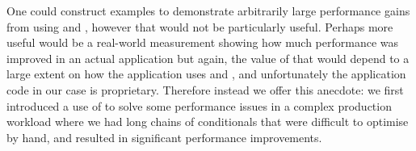 One could construct examples to demonstrate arbitrarily large
performance gains from using  and , however that
would not be particularly useful. Perhaps more useful would be a
real-world measurement showing how much performance was improved in an
actual application but again, the value of that would depend to a
large extent on how the application uses  and , and
unfortunately the application code in our case is
proprietary. Therefore instead we offer this anecdote: we first
introduced a use of  to solve some performance issues in a
complex production workload where we had long chains of conditionals
that were difficult to optimise by hand, and  resulted in
significant performance improvements.
